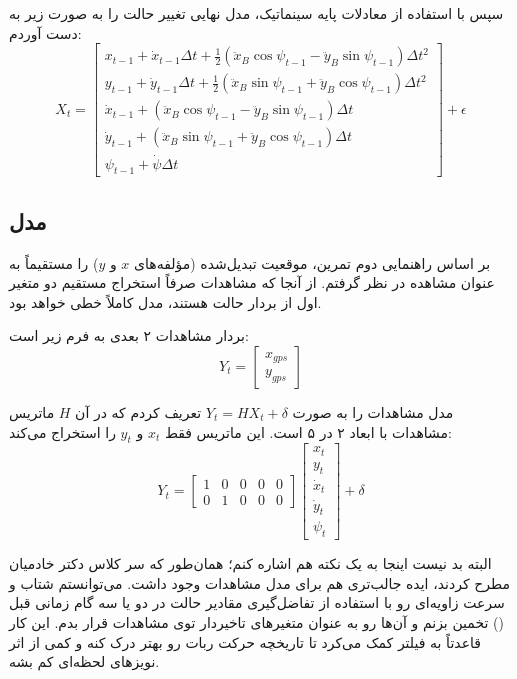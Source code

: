 \documentclass[12pt,a4paper]{article}
\begin{document}
سپس با استفاده از معادلات پایه سینماتیک، مدل نهایی تغییر حالت را به صورت زیر به دست آوردم:
$$X_t=\begin{bmatrix}x_{t-1}+\dot{x}_{t-1}\Delta t+\frac{1}{2}(\ddot{x}_B\cos\psi_{t-1}-\ddot{y}_B\sin\psi_{t-1})\Delta t^2\\y_{t-1}+\dot{y}_{t-1}\Delta t+\frac{1}{2}(\ddot{x}_B\sin\psi_{t-1}+\ddot{y}_B\cos\psi_{t-1})\Delta t^2\\\dot{x}_{t-1}+(\ddot{x}_B\cos\psi_{t-1}-\ddot{y}_B\sin\psi_{t-1})\Delta t\\\dot{y}_{t-1}+(\ddot{x}_B\sin\psi_{t-1}+\ddot{y}_B\cos\psi_{t-1})\Delta t\\\psi_{t-1}+\dot{\psi}\Delta t\end{bmatrix}+\epsilon$$

\subsection{مدل }
بر اساس راهنمایی دوم تمرین، موقعیت تبدیل‌شده  (مؤلفه‌های $x$ و $y$) را مستقیماً به عنوان مشاهده در نظر گرفتم. از آنجا که مشاهدات صرفاً استخراج مستقیم دو متغیر اول از بردار حالت هستند، مدل کاملاً خطی خواهد بود. 

بردار مشاهدات ۲ بعدی به فرم زیر است:
$$Y_t=\begin{bmatrix}x_{gps}\\y_{gps}\end{bmatrix}$$

مدل مشاهدات را به صورت $Y_t=HX_t+\delta$ تعریف کردم که در آن $H$ ماتریس مشاهدات با ابعاد ۲ در ۵ است. این ماتریس فقط $x_t$ و $y_t$ را استخراج می‌کند:
$$Y_t=\begin{bmatrix}1&0&0&0&0\\0&1&0&0&0\end{bmatrix}\begin{bmatrix}x_t\\y_t\\\dot{x}_t\\\dot{y}_t\\\psi_t\end{bmatrix}+\delta$$



البته بد نیست اینجا به یک نکته هم اشاره کنم؛ همان‌طور که سر کلاس دکتر خادمیان مطرح کردند، ایده جالب‌تری هم برای مدل مشاهدات وجود داشت. می‌توانستم شتاب و سرعت زاویه‌ای رو با استفاده از تفاضل‌گیری مقادیر حالت در دو یا سه گام زمانی قبل () تخمین بزنم و آن‌ها رو به عنوان متغیرهای تاخیردار توی مشاهدات قرار بدم. این کار قاعدتاً به فیلتر کمک می‌کرد تا تاریخچه حرکت ربات رو بهتر درک کنه و کمی از اثر نویزهای لحظه‌ای کم بشه.
\end{document}
